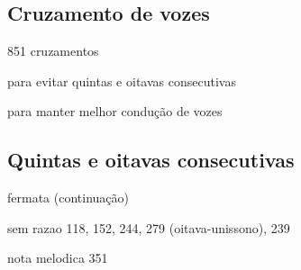 \documentclass{article}
\begin{document}
\subsection{Cruzamento de vozes}
\label{sec:cruzamento-de-vozes}

851 cruzamentos 

para evitar quintas e oitavas consecutivas

para manter melhor condução de vozes

\subsection{Quintas e oitavas consecutivas}
\label{sec:quintas-e-oitavas}

fermata (continuação)

sem razao 118, 152, 244, 279 (oitava-unissono), 239

nota melodica 351
\end{document}
